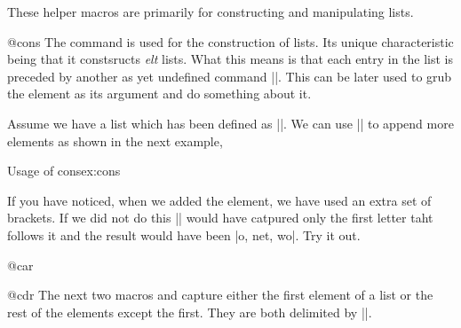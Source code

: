 These helper macros are primarily for constructing and manipulating lists. 

\begin{docCommand}{@cons} {}
The command \cmd{\@cons} is used for the construction of lists. Its unique
characteristic being that it constsructs \emph{elt} lists. What this means is that each entry in the list is
preceded by another as yet undefined command |\@elt|. This can be later used to grub the element as
its argument and do something about it.
\end{docCommand}

\begin{teX}
\def\@cons#1#2{\begingroup\let\@elt\relax\xdef#1{#1\@elt #2}\endgroup}
\end{teX}


Assume we have a list \cmd{\mylist} which has been defined as ||.
We can use |\@cons| to append more elements as shown in the next example,

\begin{texexample}{Usage of cons}{ex:cons}
\makeatletter

\def\mylist{}

\@cons\mylist{{one}}
\@cons\mylist{{two}}

\def\@elt{\space}

\meaning\mylist

\def\@elt#1{#1, }

\mylist

\makeatother
\end{texexample}

If you have noticed, when we added the element, we have used an extra set of brackets. If we did not do this
|\@elt| would have catpured only the first letter taht follows it and the result would have been |o, net, wo|. Try it out.

\begin{docCommand}{@car}{}
\end{docCommand}
\begin{docCommand}{@cdr}{}
The next two macros \cmd{\@car} and \cmd{\@cdr} capture either the first element of a list or the rest of the elements
except the first. They are both delimited by |\@nil|.
\end{docCommand}


